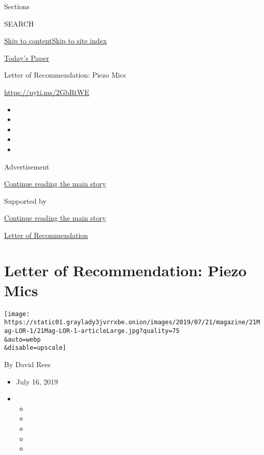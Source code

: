 Sections

SEARCH

\protect\hyperlink{site-content}{Skip to
content}\protect\hyperlink{site-index}{Skip to site index}

\href{https://myaccount.nytimes3xbfgragh.onion/auth/login?response_type=cookie\&client_id=vi}{}

\href{https://www.nytimes3xbfgragh.onion/section/todayspaper}{Today's
Paper}

Letter of Recommendation: Piezo Mics

\url{https://nyti.ms/2GbRtWE}

\begin{itemize}
\item
\item
\item
\item
\item
\end{itemize}

Advertisement

\protect\hyperlink{after-top}{Continue reading the main story}

Supported by

\protect\hyperlink{after-sponsor}{Continue reading the main story}

\href{/column/letter-of-recommendation}{Letter of Recommendation}

\hypertarget{letter-of-recommendation-piezo-mics}{%
\section{Letter of Recommendation: Piezo
Mics}\label{letter-of-recommendation-piezo-mics}}

\texttt{[image: https://static01.graylady3jvrrxbe.onion/images/2019/07/21/magazine/21Mag-LOR-1/21Mag-LOR-1-articleLarge.jpg?quality=75\\\&auto=webp\\\&disable=upscale]}

By David Rees

\begin{itemize}
\item
  July 16, 2019
\item
  \begin{itemize}
  \item
  \item
  \item
  \item
  \item
  \end{itemize}
\end{itemize}

